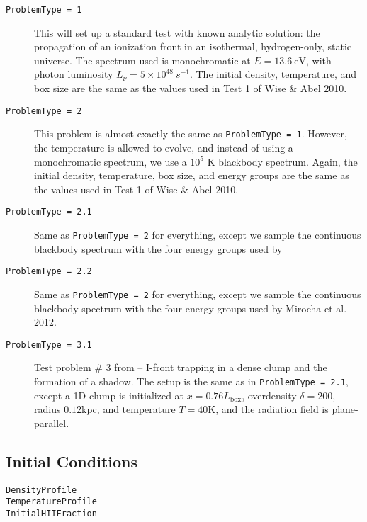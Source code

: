 \documentclass[letterpaper,titlepage,12pt]{article}
\numberwithin{equation}{section}
\begin{document}
\begin{description}
    
\item [\texttt{ProblemType = 1}] This will set up a standard test with known analytic solution: the propagation of an ionization front in an isothermal, hydrogen-only, static universe.  The spectrum used is monochromatic at $E = 13.6 \ \text{eV}$, with photon luminosity $L_{\nu} = 5\times 10^{48} \ s^{-1}$.  The initial density, temperature, and box size are the same as the values used in Test 1 of Wise \& Abel 2010. 

\item [\texttt{ProblemType = 2}] This problem is almost exactly the same as \texttt{ProblemType = 1}.  However, the temperature is allowed to evolve, and instead of using a monochromatic spectrum, we use a $10^5$ K blackbody spectrum.  Again, the initial density, temperature, box size, and energy groups are the same as the values used in Test 1 of Wise \& Abel 2010.  

\item [\texttt{ProblemType = 2.1}] Same as \texttt{ProblemType = 2} for everything, except we sample the continuous blackbody spectrum with the four energy groups used by \citet{Wise2011}

\item [\texttt{ProblemType = 2.2}] Same as \texttt{ProblemType = 2} for everything, except we sample the continuous blackbody spectrum with the four energy groups used by Mirocha et al. 2012.

\item [\texttt{ProblemType = 3.1}] Test problem \# 3 from \cite{Iliev2006} -- I-front trapping in a dense clump and the formation of a shadow.  The setup is the same as in \texttt{ProblemType = 2.1}, except a 1D clump is initialized at $x = 0.76 L_{\mathrm{box}}$, overdensity $\delta = 200$, radius $0.12$kpc, and temperature $T = 40$K, and the radiation field is plane-parallel.
\end{description}

\subsection{Initial Conditions}
\begin{description}
    
\item [\texttt{DensityProfile}]  

\item [\texttt{TemperatureProfile}]

\item [\texttt{InitialHIIFraction}]  

\end{description}
\end{document}

